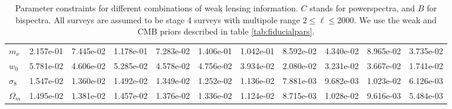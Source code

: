 \documentclass[11pt]{article} %
\begin{document}
\begin{table}
\begin{tabular}{|l|r|rrr|rrr|rrr|}
        \hline
 $m_\nu$    & 2.157e-01 &  7.445e-02 &                  1.178e-01 &                           7.283e-02 &  1.406e-01 &                  1.042e-01 &                           8.592e-02 &  4.340e-02 &                  8.965e-02 &                           3.735e-02 \\
 $w_0$      & 5.781e-02 &  4.606e-02 &                  5.285e-02 &                           4.578e-02 &  4.756e-02 &                  3.934e-02 &                           2.080e-02 &  3.231e-02 &                  3.667e-02 &                           1.741e-02 \\
 $\sigma_8$ & 1.547e-02 &  1.360e-02 &                  1.492e-02 &                           1.349e-02 &  1.252e-02 &                  1.136e-02 &                           7.881e-03 &  9.682e-03 &                  1.023e-02 &                           6.126e-03 \\
 $\Omega_m$ & 1.495e-02 &  1.381e-02 &                  1.457e-02 &                           1.376e-02 &  1.336e-02 &                  1.124e-02 &                           8.715e-03 &  1.028e-02 &                  9.616e-03 &                           5.484e-03 \\
       \hline
        \end{tabular}
\caption{Parameter constraints for different combinations of weak lensing information. $C$ stands for powerspectra, and $B$ for bispectra. All surveys are assumed to be stage 4 surveys with multipole range $2 \leq \ell \leq 2000$. We use the weak and CMB priors described in table \ref{tab:fiducialpars}.}
\label{tab:paramconstraintstight}
\end{table}

\end{document}
